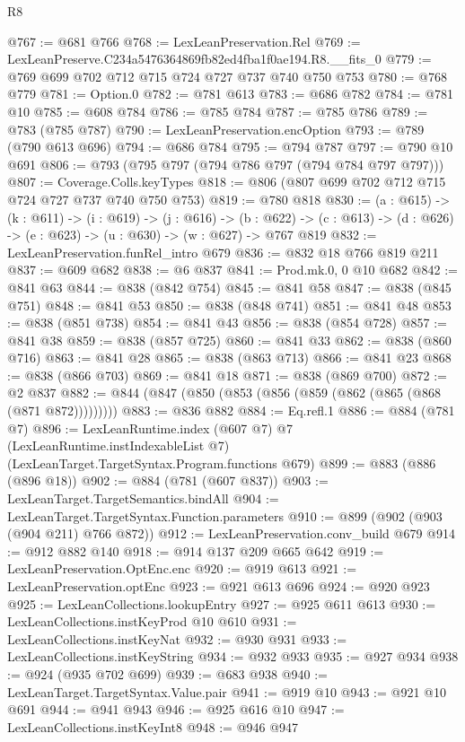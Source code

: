 \begin{lexlean}{R8}
\begin{coremodule}
@767 := @681 @766
@768 := LexLeanPreservation.Rel
@769 := LexLeanPreserve.C234a5476364869fb82ed4fba1f0ae194.R8.__fits_0
@779 := @769 @699 @702 @712 @715 @724 @727 @737 @740 @750 @753
@780 := @768 @779
@781 := Option.{0}
@782 := @781 @613
@783 := @686 @782
@784 := @781 @10
@785 := @608 @784
@786 := @785 @784
@787 := @785 @786
@789 := @783 (@785 @787)
@790 := LexLeanPreservation.encOption
@793 := @789 (@790 @613 @696)
@794 := @686 @784
@795 := @794 @787
@797 := @790 @10 @691
@806 := @793 (@795 @797 (@794 @786 @797 (@794 @784 @797 @797)))
@807 := Coverage.Colls.keyTypes
@818 := @806 (@807 @699 @702 @712 @715 @724 @727 @737 @740 @750 @753)
@819 := @780 @818
@830 := (a : @615) ->
  (k : @611) ->
  (i : @619) ->
  (j : @616) ->
  (b : @622) -> (c : @613) -> (d : @626) -> (e : @623) -> (u : @630) -> (w : @627) -> @767 @819
@832 := LexLeanPreservation.funRel_intro @679
@836 := @832 @18 @766 @819 @211
@837 := @609 @682
@838 := @6 @837
@841 := Prod.mk.{0, 0} @10 @682
@842 := @841 @63
@844 := @838 (@842 @754)
@845 := @841 @58
@847 := @838 (@845 @751)
@848 := @841 @53
@850 := @838 (@848 @741)
@851 := @841 @48
@853 := @838 (@851 @738)
@854 := @841 @43
@856 := @838 (@854 @728)
@857 := @841 @38
@859 := @838 (@857 @725)
@860 := @841 @33
@862 := @838 (@860 @716)
@863 := @841 @28
@865 := @838 (@863 @713)
@866 := @841 @23
@868 := @838 (@866 @703)
@869 := @841 @18
@871 := @838 (@869 @700)
@872 := @2 @837
@882 := @844 (@847 (@850 (@853 (@856 (@859 (@862 (@865 (@868 (@871 @872)))))))))
@883 := @836 @882
@884 := Eq.refl.{1}
@886 := @884 (@781 @7)
@896 := LexLeanRuntime.index
    (@607 @7)
    @7
    (LexLeanRuntime.instIndexableList @7)
    (LexLeanTarget.TargetSyntax.Program.functions @679)
@899 := @883 (@886 (@896 @18))
@902 := @884 (@781 (@607 @837))
@903 := LexLeanTarget.TargetSemantics.bindAll
@904 := LexLeanTarget.TargetSyntax.Function.parameters
@910 := @899 (@902 (@903 (@904 @211) @766 @872))
@912 := LexLeanPreservation.conv_build @679
@914 := @912 @882 @140
@918 := @914 @137 @209 @665 @642
@919 := LexLeanPreservation.OptEnc.enc
@920 := @919 @613
@921 := LexLeanPreservation.optEnc
@923 := @921 @613 @696
@924 := @920 @923
@925 := LexLeanCollections.lookupEntry
@927 := @925 @611 @613
@930 := LexLeanCollections.instKeyProd @10 @610
@931 := LexLeanCollections.instKeyNat
@932 := @930 @931
@933 := LexLeanCollections.instKeyString
@934 := @932 @933
@935 := @927 @934
@938 := @924 (@935 @702 @699)
@939 := @683 @938
@940 := LexLeanTarget.TargetSyntax.Value.pair
@941 := @919 @10
@943 := @921 @10 @691
@944 := @941 @943
@946 := @925 @616 @10
@947 := LexLeanCollections.instKeyInt8
@948 := @946 @947

\end{coremodule}
\end{lexlean}
